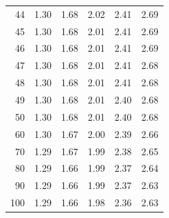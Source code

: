 \begin{center}
\begin{tabular}{r | rrr rr}
44  &  {\normalsize  1.30} & {\normalsize  1.68} & {\normalsize  2.02} & {\normalsize  2.41} & {\normalsize  2.69}  \\ 
45  &  {\normalsize  1.30} & {\normalsize  1.68} & {\normalsize  2.01} & {\normalsize  2.41} & {\normalsize  2.69}  \\ 
\hline
46  &  {\normalsize  1.30} & {\normalsize  1.68} & {\normalsize  2.01} & {\normalsize  2.41} & {\normalsize  2.69}  \\ 
47  &  {\normalsize  1.30} & {\normalsize  1.68} & {\normalsize  2.01} & {\normalsize  2.41} & {\normalsize  2.68}  \\ 
48  &  {\normalsize  1.30} & {\normalsize  1.68} & {\normalsize  2.01} & {\normalsize  2.41} & {\normalsize  2.68}  \\ 
49  &  {\normalsize  1.30} & {\normalsize  1.68} & {\normalsize  2.01} & {\normalsize  2.40} & {\normalsize  2.68}  \\ 
50  &  {\normalsize  1.30} & {\normalsize  1.68} & {\normalsize  2.01} & {\normalsize  2.40} & {\normalsize  2.68}  \\ 
\hline
\hline
60  &  {\normalsize  1.30} & {\normalsize  1.67} & {\normalsize  2.00} & {\normalsize  2.39} & {\normalsize  2.66}  \\ 
70  &  {\normalsize  1.29} & {\normalsize  1.67} & {\normalsize  1.99} & {\normalsize  2.38} & {\normalsize  2.65}  \\ 
80  &  {\normalsize  1.29} & {\normalsize  1.66} & {\normalsize  1.99} & {\normalsize  2.37} & {\normalsize  2.64}  \\ 
90  &  {\normalsize  1.29} & {\normalsize  1.66} & {\normalsize  1.99} & {\normalsize  2.37} & {\normalsize  2.63}  \\ 
100  &  {\normalsize  1.29} & {\normalsize  1.66} & {\normalsize  1.98} & {\normalsize  2.36} & {\normalsize  2.63}  \\ 

\end{tabular}
\end{center}
